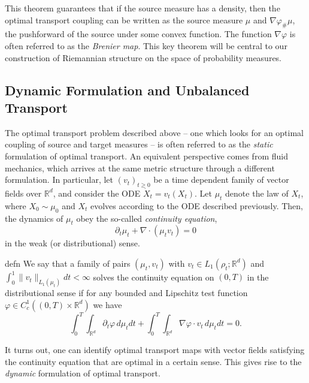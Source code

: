 \documentclass[11pt]{article}
\begin{document}
This theorem guarantees that if the source measure has a density, then the optimal transport coupling can be written as the source measure $\mu$ and $\nabla \varphi_\#\mu$, the pushforward of the source under some convex function. The function $\nabla\varphi$ is often referred to as the \textit{Brenier map}. This key theorem will be central to our construction of Riemannian structure on the space of probability measures. 

\subsection{Dynamic Formulation and Unbalanced Transport}

The optimal transport problem described above -- one which looks for an optimal coupling of source and target measures -- is often referred to as the \textit{static} formulation of optimal transport. An equivalent perspective comes from fluid mechanics, which arrives at the same metric structure through a different formulation. In particular, let $(v_t)_{t \geq 0}$ be a time dependent family of vector fields over $\mathbb{R}^d$, and consider the ODE $\dot X_t = v_t(X_t)$. Let $\mu_t$ denote the law of $X_t$, where $X_0 \sim \mu_0$ and $X_t$ evolves according to the ODE described previously. Then, the dynamics of $\mu_t$ obey the so-called \textit{continuity equation},
\begin{equation}
    \partial_t\mu_t + \nabla \cdot (\mu_t v_t) = 0 \label{eq: balanced continuity eqn}
\end{equation}
in the weak (or distributional) sense. 
\begin{restatable}{defn}{}
    We say that a family of pairs $(\mu_t, v_t)$ with $v_t \in L_1(\rho_t; \mathbb{R}^d)$ and $\int_0^1\|v_t\|_{L_1(\mu_t)}dt < \infty$ solves the continuity equation on $(0, T)$ in the distributional sense if for any bounded and Lipschitz test function $\varphi \in C^1_c((0, T)\times \mathbb{R}^d)$ we have
    \[\int_0^T\int_{\mathbb{R}^d} \partial_t\varphi \, d\mu_tdt + \int_0^T\int_{\mathbb{R}^d} \nabla\varphi \cdot v_t \, d\mu_tdt = 0.\]
\end{restatable}

It turns out, one can identify optimal transport maps with vector fields satisfying the continuity equation that are optimal in a certain sense. This gives rise to the \textit{dynamic} formulation of optimal transport.
\end{document}
